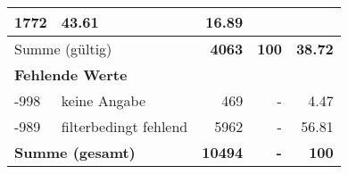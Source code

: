 \begin{longtable}{lXrrr}
       \num{1772} &
       \num[round-mode=places,round-precision=2]{43,61} &
         \num[round-mode=places,round-precision=2]{16,89} \\
     \midrule
     \multicolumn{2}{l}{Summe (gültig)} &
       \textbf{\num{4063}} &
     \textbf{100} &
       \textbf{\num[round-mode=places,round-precision=2]{38,72}} \\
     \multicolumn{5}{l}{\textbf{Fehlende Werte}}\\
       -998 &
       keine Angabe &
         \num{469} &
        - &
         \num[round-mode=places,round-precision=2]{4,47} \\
       -989 &
       filterbedingt fehlend &
         \num{5962} &
        - &
         \num[round-mode=places,round-precision=2]{56,81} \\
     \midrule
     \multicolumn{2}{l}{\textbf{Summe (gesamt)}} &
          \textbf{\num{10494}} &
        \textbf{-} &
        \textbf{100} \\
     \bottomrule
     \end{longtable}
     

